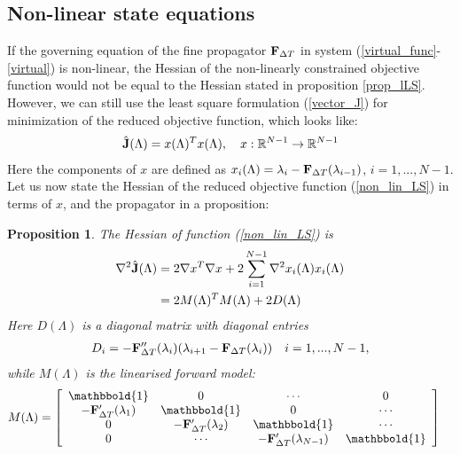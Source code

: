 \documentclass[11pt,a4paper]{article}
\newtheorem{proposition}{Proposition}
\begin{document}
\subsection{Non-linear state equations}
If the governing equation of the fine propagator $\bold F_{\Delta T}$ in system (\ref{virtual_func}-\ref{virtual}) is non-linear, the Hessian of the non-linearly constrained objective function would not be equal to the Hessian stated in proposition \ref{prop_lLS}. However, we can still use the least square formulation (\ref{vector_J}) for minimization of the reduced objective function, which looks like: 
\begin{align}
\hat{\bold J}(\Lambda) = x(\Lambda)^Tx(\Lambda), \quad x:\mathbb{R}^{N-1}\rightarrow \mathbb{R}^{N-1} \label{non_lin_LS}
\end{align} 
Here the components of $x$ are defined as $x_i(\Lambda)=\lambda_{i}-\bold F_{\Delta T}(\lambda_{i-1})$, $i=1,...,N-1$. Let us now state the Hessian of the reduced objective function (\ref{non_lin_LS}) in terms of $x$, and the propagator in a proposition:
\begin{proposition}\label{NonLin_prop}
The Hessian of function (\ref{non_lin_LS}) is
\begin{align*}
\nabla^2 \hat{\bold J}(\Lambda) &= 2\nabla x^T\nabla x + 2\sum_{i=1}^{N-1} \nabla^2 x_i(\Lambda) x_i(\Lambda)\\
&=2M(\Lambda)^TM(\Lambda) + 2D(\Lambda)
\end{align*}
Here $D(\Lambda)$ is a diagonal matrix with diagonal entries 
\begin{align*}
D_i=-\bold{F}_{\Delta T}''(\lambda_i)(\lambda_{i+1}-\bold F_{\Delta T}(\lambda_i)) \quad i=1,...,N-1,
\end{align*}
while $M(\Lambda)$ is the linearised forward model:
\begin{align*}
M(\Lambda) &= \left[ \begin{array}{cccc}
   \mathbbold{1} & 0 & \cdots & 0 \\  
   -\bold{F}_{\Delta T}'(\lambda_{1}) & \mathbbold{1} & 0 & \cdots \\ 
   0 &-\bold{F}_{\Delta T}'(\lambda_{2}) & \mathbbold{1}  & \cdots \\
   0 &\cdots &-\bold{F}_{\Delta T}'(\lambda_{N-1}) & \mathbbold{1}  \\
   \end{array}  \right]
\end{align*}	
\end{proposition}
\end{document}
